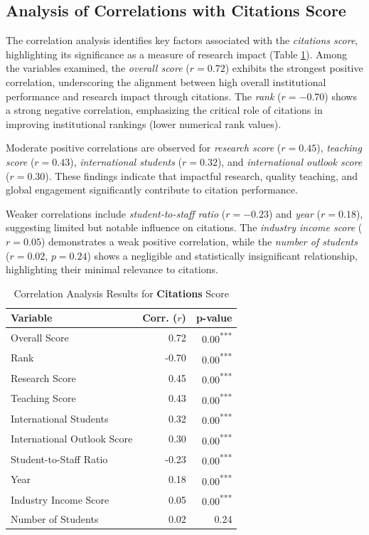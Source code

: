 \documentclass[sigconf]{acmart}
\begin{document}
\subsection{Analysis of Correlations with Citations Score}

The correlation analysis identifies key factors associated with the \textit{citations score}, highlighting its significance as a measure of research impact (Table \ref{tab:correlation_citations}). Among the variables examined, the \textit{overall score} ($r = 0.72$) exhibits the strongest positive correlation, underscoring the alignment between high overall institutional performance and research impact through citations. The \textit{rank} ($r = -0.70$) shows a strong negative correlation, emphasizing the critical role of citations in improving institutional rankings (lower numerical rank values).

Moderate positive correlations are observed for \textit{research score} ($r = 0.45$), \textit{teaching score} ($r = 0.43$), \textit{international students} ($r = 0.32$), and \textit{international outlook score} ($r = 0.30$). These findings indicate that impactful research, quality teaching, and global engagement significantly contribute to citation performance.

Weaker correlations include \textit{student-to-staff ratio} ($r = -0.23$) and \textit{year} ($r = 0.18$), suggesting limited but notable influence on citations. The \textit{industry income score} ($r = 0.05$) demonstrates a weak positive correlation, while the \textit{number of students} ($r = 0.02$, $p = 0.24$) shows a negligible and statistically insignificant relationship, highlighting their minimal relevance to citations.

\begin{table}[h!]
	\centering
	\caption{Correlation Analysis Results for \textbf{Citations} Score}
	\label{tab:correlation_citations}
	\begin{tabular}{|l|r|r|}
		\hline
		\textbf{Variable} & \textbf{Corr. ($r$)} & \textbf{p-value} \\
		\hline
		Overall Score & 0.72 & 0.00\textsuperscript{***} \\
		Rank & -0.70 & 0.00\textsuperscript{***} \\
		Research Score & 0.45 & 0.00\textsuperscript{***} \\
		Teaching Score & 0.43 & 0.00\textsuperscript{***} \\
		International Students & 0.32 & 0.00\textsuperscript{***} \\
		International Outlook Score & 0.30 & 0.00\textsuperscript{***} \\
		Student-to-Staff Ratio & -0.23 & 0.00\textsuperscript{***} \\
		Year & 0.18 & 0.00\textsuperscript{***} \\
		Industry Income Score & 0.05 & 0.00\textsuperscript{***} \\
		Number of Students & 0.02 & 0.24 \\
		\hline
	\end{tabular}
\end{table}
\end{document}
